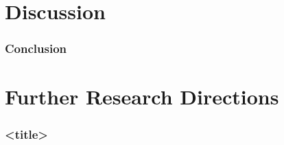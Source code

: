 \section{Discussion}



\begin{frame}
  \frametitle{Conclusion}

  

\end{frame}


\section{Further Research Directions}
\begin{frame}
  \frametitle{<title>}

  

\end{frame}